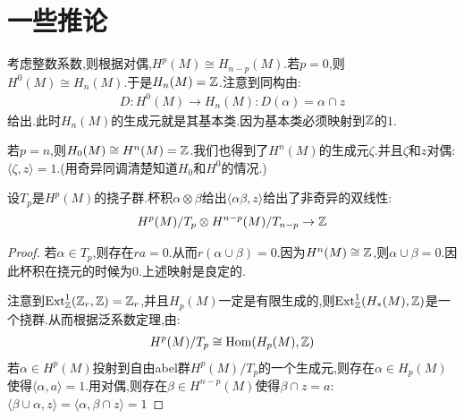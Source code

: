 \section{一些推论}
考虑整数系数,则根据对偶,$H^p(M)\cong H_{n-p}(M)$.若$p=0$,则$H^0(M)\cong H_n(M)$.于是$H_n(M)=\mathbb{Z}$.注意到同构由:
\begin{align*}
    D:H^0(M) \to H_n(M): D(\alpha)=\alpha \cap z
\end{align*}
给出.此时$H_n(M)$的生成元就是其基本类.因为基本类必须映射到$\mathbb{Z}$的$1$.

若$p=n$,则$H_0(M)\cong H^n(M)=\mathbb{Z}$.我们也得到了$H^n(M)$的生成元$\zeta$.并且$\zeta$和$z$对偶:$\langle \zeta,z\rangle=1$.(用奇异同调清楚知道$H_0$和$H^0$的情况.)

\begin{corollary}
    设$T_p$是$H^p(M)$的挠子群.杯积$\alpha \otimes \beta$给出$\langle \alpha\beta,z\rangle$给出了非奇异的双线性:
    \begin{align*}
        H^p(M)/T_p \otimes H^{n-p}(M)/T_{n-p}\to \mathbb{Z}
    \end{align*}
\end{corollary}
\begin{proof}
    若$\alpha \in T_p$,则存在$ra=0$.从而$r(\alpha \cup \beta)=0$.因为$H^n(M)\cong \mathbb{Z}$,则$\alpha \cup \beta=0$.因此杯积在挠元的时候为$0$.上述映射是良定的.

    注意到$\mathrm{Ext}_{\mathbb{Z}}^1(\mathbb{Z}_r,\mathbb{Z})=\mathbb{Z}_r$,并且$H_p(M)$一定是有限生成的,则$\mathrm{Ext}_{\mathbb{Z}}^1(H_*(M),\mathbb{Z})$是一个挠群.从而根据泛系数定理,由:
    \begin{align*}
        H^p(M)/T_p\cong \mathrm{Hom}(H_p(M),\mathbb{Z})
    \end{align*}
    若$\alpha \in H^p(M)$投射到自由abel群$H^p(M)/T_p$的一个生成元,则存在$\alpha \in H_p(M)$使得$\langle \alpha,a\rangle=1$.用对偶,则存在$\beta \in H^{n-p}(M)$使得$\beta \cap z=a$:$\langle \beta \cup \alpha,z\rangle=\langle \alpha,\beta \cap z\rangle=1$
\end{proof}

